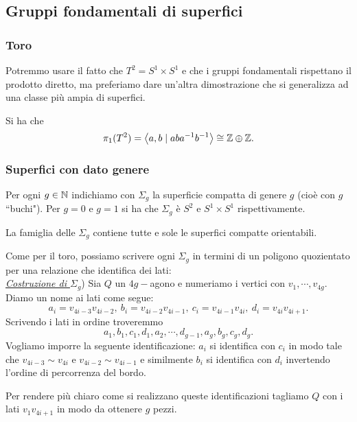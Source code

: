 \begin{multicols*}{2}
\subsection{Gruppi fondamentali di superfici}
\subsubsection{Toro}
Potremmo usare il fatto che $T^2=S^1\times S^1$ e che i gruppi fondamentali rispettano il prodotto diretto, ma preferiamo dare un'altra dimostrazione che si generalizza ad una classe pi\`u ampia di superfici.

\begin{theorem}\label{GruppoFondamentaleToro}
Si ha che
\[\pi_1(T^2)=\left\langle a,b\mid aba^{-1} b^{-1}\right\rangle\cong \mathbb{Z}\oplus \mathbb{Z}.\]
\end{theorem}

\subsubsection{Superfici con dato genere}
Per ogni $g\in\mathbb{N}$ indichiamo con $\Sigma_g$ la superficie compatta di genere $g$ (cio\`e con $g$ ``buchi"). Per $g=0$ e $g=1$ si ha che $\Sigma_g$ \`e $S^2$ e $S^1\times S^1$ rispettivamente.

\begin{fact}
La famiglia delle $\Sigma_g$ contiene tutte e sole le superfici compatte orientabili.
\end{fact}

\noindent Come per il toro, possiamo scrivere ogni $\Sigma_g$ in termini di un poligono quozientato per una relazione che identifica dei lati:\\
\ul{\textit{Costruzione di $\Sigma_g$}}) Sia $Q$ un $4g-$agono e numeriamo i vertici con $v_1,\cdots, v_{4g}$. Diamo un nome ai lati come segue:
\[a_i=v_{4i-3}v_{4i-2},\ b_i=v_{4i-2}v_{4i-1},\ c_i=v_{4i-1}v_{4i},\ d_i=v_{4i}v_{4i+1}.\]
Scrivendo i lati in ordine troveremmo
\[a_1,b_1,c_1,d_1,a_2,\cdots, d_{g-1},a_g,b_g,c_g,d_g.\]
Vogliamo imporre la seguente identificazione: $a_i$ si identifica con $c_i$ in modo tale che $v_{4i-3}\sim v_{4i}$ e $v_{4i-2}\sim v_{4i-1}$ e similmente $b_i$ si identifica con $d_i$ invertendo l'ordine di percorrenza del bordo.
\bigskip

\noindent Per rendere pi\`u chiaro come si realizzano queste identificazioni tagliamo $Q$ con i lati $v_1v_{4i+1}$ in modo da ottenere $g$ pezzi.


\end{multicols*}
